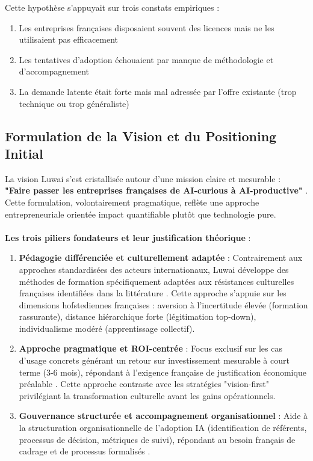 Cette hypothèse s'appuyait sur trois constats empiriques :
\begin{enumerate}
    \item Les entreprises françaises disposaient souvent des licences mais ne les utilisaient pas efficacement
    \item Les tentatives d'adoption échouaient par manque de méthodologie et d'accompagnement
    \item La demande latente était forte mais mal adressée par l'offre existante (trop technique ou trop généraliste)
\end{enumerate}

\subsection{Formulation de la Vision et du Positioning Initial}

La vision Luwai s'est cristallisée autour d'une mission claire et mesurable : \textbf{"Faire passer les entreprises françaises de AI-curious à AI-productive"} \cite{luwai2024vision}. Cette formulation, volontairement pragmatique, reflète une approche entrepreneuriale orientée impact quantifiable plutôt que technologie pure.
\\\\
\textbf{Les trois piliers fondateurs et leur justification théorique} :

\begin{enumerate}
    \item \textbf{Pédagogie différenciée et culturellement adaptée} : Contrairement aux approches standardisées des acteurs internationaux, Luwai développe des méthodes de formation spécifiquement adaptées aux résistances culturelles françaises identifiées dans la littérature \cite{meyer2014culture}. Cette approche s'appuie sur les dimensions hofstediennes françaises : aversion à l'incertitude élevée (formation rassurante), distance hiérarchique forte (légitimation top-down), individualisme modéré (apprentissage collectif).

    \item \textbf{Approche pragmatique et ROI-centrée} : Focus exclusif sur les cas d'usage concrets générant un retour sur investissement mesurable à court terme (3-6 mois), répondant à l'exigence française de justification économique préalable \cite{anthony2020planning}. Cette approche contraste avec les stratégies "vision-first" privilégiant la transformation culturelle avant les gains opérationnels.

    \item \textbf{Gouvernance structurée et accompagnement organisationnel} : Aide à la structuration organisationnelle de l'adoption IA (identification de référents, processus de décision, métriques de suivi), répondant au besoin français de cadrage et de processus formalisés \cite{bureaucracy2024france}.
\end{enumerate}

